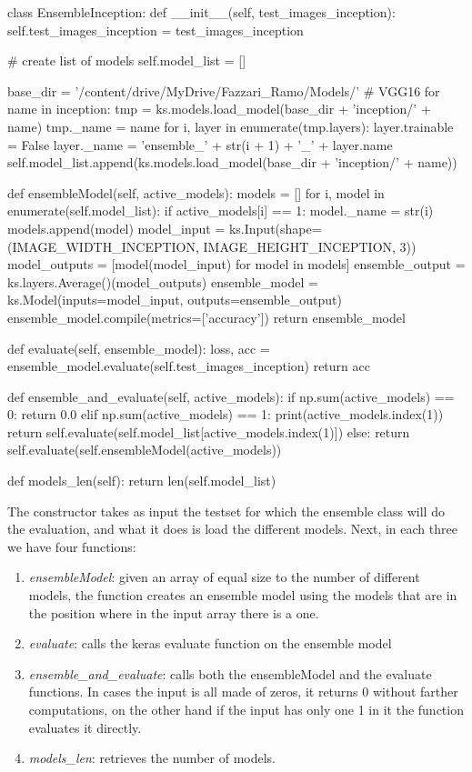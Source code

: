 \begin{python}
class EnsembleInception:
    def __init__(self, test_images_inception):
        self.test_images_inception = test_images_inception

        # create list of models
        self.model_list = []

        base_dir = '/content/drive/MyDrive/Fazzari_Ramo/Models/'
        # VGG16
        for name in inception:
            tmp = ks.models.load_model(base_dir + 'inception/' + name)
            tmp._name = name
            for i, layer in enumerate(tmp.layers):
                layer.trainable = False
                layer._name = 'ensemble_' + str(i + 1) + '_' + layer.name
            self.model_list.append(ks.models.load_model(base_dir + 'inception/' + name))


    def ensembleModel(self, active_models):
        models = []
        for i, model in enumerate(self.model_list):
            if active_models[i] == 1:
                model._name = str(i)
                models.append(model)
        model_input = ks.Input(shape=(IMAGE_WIDTH_INCEPTION, IMAGE_HEIGHT_INCEPTION, 3))
        model_outputs = [model(model_input) for model in models]
        ensemble_output = ks.layers.Average()(model_outputs)
        ensemble_model = ks.Model(inputs=model_input, outputs=ensemble_output)
        ensemble_model.compile(metrics=['accuracy'])
        return ensemble_model

    def evaluate(self, ensemble_model):
        loss, acc = ensemble_model.evaluate(self.test_images_inception)
        return acc

    def ensemble_and_evaluate(self, active_models):
        if np.sum(active_models) == 0:
            return 0.0
        elif np.sum(active_models) == 1:
            print(active_models.index(1))
            return self.evaluate(self.model_list[active_models.index(1)])
        else:
            return self.evaluate(self.ensembleModel(active_models))

    def models_len(self):
        return len(self.model_list)
\end{python}

The constructor takes as input the testset for which the ensemble class will do the evaluation, and what it does is load the different models. Next, in each three we have four functions:

\begin{enumerate}
	\item \textit{ensembleModel}: given an array of equal size to the number of different models, the function creates an ensemble model using the models that are in the position where in the input array there is a one.
	\item \textit{evaluate}: calls the keras evaluate function on the ensemble model
	\item \textit{ensemble\_and\_evaluate}: calls both the ensembleModel and the evaluate functions. In cases the input is all made of zeros, it returns 0 without farther computations, on the other hand if the input has only one 1 in it the function evaluates it directly.
	\item \textit{models\_len}: retrieves the number of models.
\end{enumerate}

